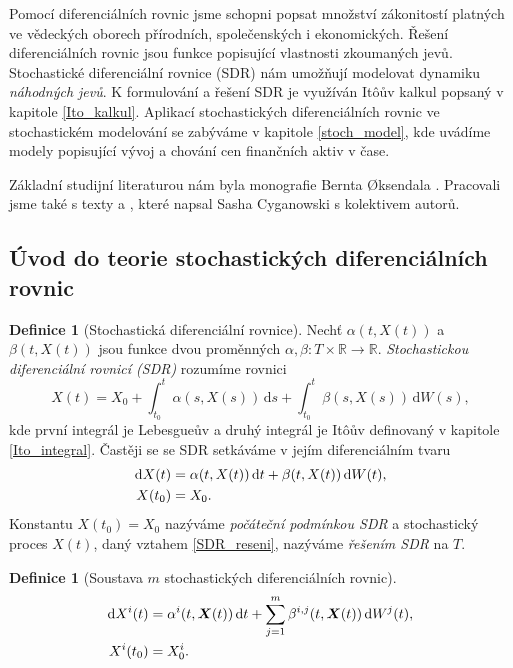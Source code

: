 \documentclass[a4paper,12pt]{report}
\theoremstyle{definition} \newtheorem{definice}[veta]{Definice}
\theoremstyle{remark}
\begin{document}
Pomocí diferenciálních rovnic jsme schopni popsat množství zákonitostí platných ve vědeckých oborech přírodních, společenských i ekonomických.
Řešení diferenciálních rovnic jsou funkce popisující vlastnosti zkoumaných jevů.
Stochastické diferenciální rovnice (SDR) nám umožňují modelovat dynamiku \textit{náhodných jevů}.
K formulování a řešení SDR je využíván It\^oův kalkul popsaný v kapitole \ref{Ito_kalkul}.
Aplikací stochastických diferenciálních rovnic ve stochastickém modelování se zabýváme v kapitole \ref{stoch_model}, kde uvádíme modely popisující vývoj a chování cen finančních aktiv v čase.

Základní studijní literaturou nám byla monografie Bernta {\O}ksendala \cite{oksendal2003stochastic}.
Pracovali jsme také s texty \cite{cyganowski1998maple} a \cite{cyganowski2002elementary}, které napsal Sasha Cyganowski s kolektivem autorů.

\subsection{Úvod do teorie stochastických diferenciálních rovnic}
\begin{definice}[Stochastická diferenciální rovnice]
Nechť $\alpha(t,X(t))$ a $\beta(t,X(t))$ jsou funkce dvou proměnných $\alpha,\beta:T\times\mathbb{R}\to\mathbb{R}$.
\textit{Stochastickou diferenciální rovnicí (SDR)} rozumíme rovnici
\begin{equation}\label{SDR_reseni}
X(t)=X_0+\int_{t_0}^t\alpha(s,X(s))\,\mathrm{d}s+\int_{t_0}^t\beta(s,X(s))\,\mathrm{d}W(s),
\end{equation}
kde první integrál je Lebesgueův a druhý integrál je It\^oův definovaný v kapitole \ref{Ito_integral}.
Častěji se se SDR setkáváme v jejím diferenciálním tvaru
\begin{align}\label{SDR_def}
\mathrm{d}X(t)&=\alpha(t,X(t))\,\mathrm{d}t+\beta(t,X(t))\,\mathrm{d}W(t),\\%
X(t_0)&=X_0.\notag
\end{align}
Konstantu $X(t_0)=X_0$ nazýváme \textit{počáteční podmínkou SDR} a stochastický proces $X(t)$, daný vztahem \eqref{SDR_reseni}, nazýváme \textit{řešením SDR} na $T$.
\end{definice}

\begin{definice}[Soustava $m$ stochastických diferenciálních rovnic]
\begin{align}\label{SSDR_def}
\mathrm{d}X^i(t)&=\alpha^i(t,\boldsymbol{X}(t))\,\mathrm{d}t+\sum_{j=1}^m\beta^{i,j}(t,\boldsymbol{X}(t))\,\mathrm{d}W^j(t),\\%
X^i(t_0)&=X^i_0.\notag
\end{align}
\end{definice}
\end{document}
